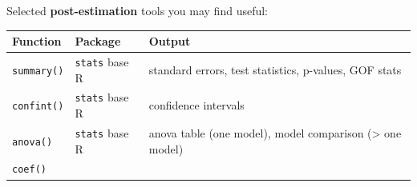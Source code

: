 \documentclass[]{book}
\begin{document}
Selected \textbf{post-estimation} tools you may find useful:

\begin{longtable}[]{@{}lll@{}}
\toprule
\begin{minipage}[b]{0.16\columnwidth}\raggedright\strut
Function\strut
\end{minipage} & \begin{minipage}[b]{0.17\columnwidth}\raggedright\strut
Package\strut
\end{minipage} & \begin{minipage}[b]{0.58\columnwidth}\raggedright\strut
Output\strut
\end{minipage}\tabularnewline
\midrule
\endhead
\begin{minipage}[t]{0.16\columnwidth}\raggedright\strut
\texttt{summary()}\strut
\end{minipage} & \begin{minipage}[t]{0.17\columnwidth}\raggedright\strut
\texttt{stats} base R\strut
\end{minipage} & \begin{minipage}[t]{0.58\columnwidth}\raggedright\strut
standard errors, test statistics, p-values, GOF stats\strut
\end{minipage}\tabularnewline
\begin{minipage}[t]{0.16\columnwidth}\raggedright\strut
\texttt{confint()}\strut
\end{minipage} & \begin{minipage}[t]{0.17\columnwidth}\raggedright\strut
\texttt{stats} base R\strut
\end{minipage} & \begin{minipage}[t]{0.58\columnwidth}\raggedright\strut
confidence intervals\strut
\end{minipage}\tabularnewline
\begin{minipage}[t]{0.16\columnwidth}\raggedright\strut
\texttt{anova()}\strut
\end{minipage} & \begin{minipage}[t]{0.17\columnwidth}\raggedright\strut
\texttt{stats} base R\strut
\end{minipage} & \begin{minipage}[t]{0.58\columnwidth}\raggedright\strut
anova table (one model), model comparison (\textgreater{} one
model)\strut
\end{minipage}\tabularnewline
\begin{minipage}[t]{0.16\columnwidth}\raggedright\strut
\texttt{coef()}\strut
\end{minipage} & \begin{minipage}[t]{0.17\columnwidth}\raggedright\strut

\end{minipage}
\end{longtable}
\end{document}

